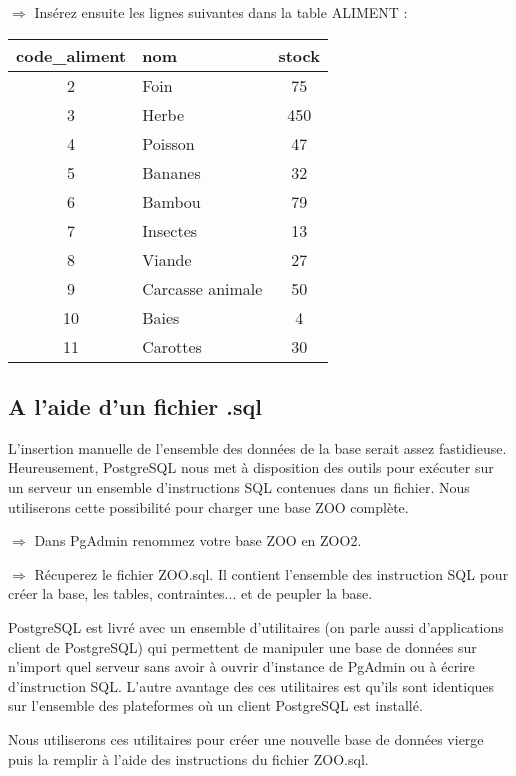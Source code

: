 \documentclass[11pt]{article}
\begin{document}
				$\Rightarrow$ Insérez ensuite les lignes suivantes dans la table ALIMENT :
				
				\begin{center}
					\begin{tabular}{c|l|c}
						\textbf{code\_aliment} & \textbf{nom} & \textbf{stock} \\
						\hline
						2 & Foin & 75 \\
						3 & Herbe & 450 \\
						4 & Poisson & 47 \\
						5 & Bananes & 32 \\
						6 & Bambou & 79 \\
						7 & Insectes & 13 \\
						8 & Viande & 27 \\
						9 & Carcasse animale & 50 \\
						10 & Baies & 4 \\
						11 & Carottes & 30 \\
					\end{tabular}
				\end{center}
				
				
			\subsection{A l'aide d'un fichier .sql}
				L'insertion manuelle de l'ensemble des données de la base serait assez fastidieuse. Heureusement, PostgreSQL nous met à disposition des outils pour exécuter sur un serveur un ensemble d'instructions SQL contenues dans un fichier. Nous utiliserons cette possibilité pour charger une base ZOO complète.
				
				$\Rightarrow$ Dans PgAdmin renommez votre base ZOO en ZOO2.
				
				$\Rightarrow$ Récuperez le fichier ZOO.sql. Il contient l'ensemble des instruction SQL pour créer la base, les tables, contraintes... et de peupler la base.
				
				PostgreSQL est livré avec un ensemble d'utilitaires (on parle aussi d'applications client de PostgreSQL) qui permettent de manipuler une base de données sur n'import quel serveur sans avoir à ouvrir d'instance de PgAdmin ou à écrire d'instruction SQL. L'autre avantage des ces utilitaires est qu'ils sont identiques sur l'ensemble des plateformes où un client PostgreSQL est installé.
				
				Nous utiliserons ces utilitaires pour créer une nouvelle base de données vierge puis la remplir à l'aide des instructions du fichier ZOO.sql.
				
\end{document}
